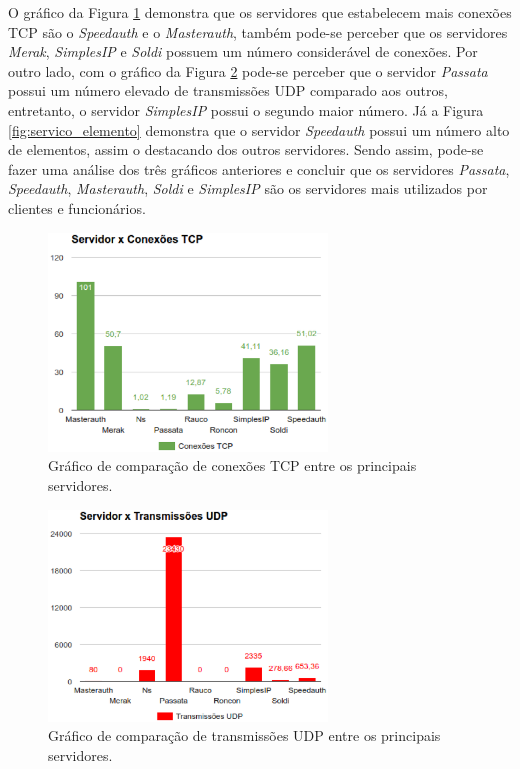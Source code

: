 O gráfico da Figura \ref{fig:servico_tcp} demonstra que os servidores que estabelecem mais conexões \ac{TCP} são o \textit{Speedauth} e o 
\textit{Masterauth}, também pode-se perceber que os servidores \textit{Merak}, \textit{SimplesIP} e \textit{Soldi} possuem um número considerável 
de conexões. Por outro lado, com o gráfico da Figura \ref{fig:servico_udp} pode-se perceber que o servidor \textit{Passata} possui um
número elevado de transmissões \ac{UDP} comparado aos outros, entretanto, o servidor \textit{SimplesIP} possui o segundo maior número. Já a Figura 
\ref{fig:servico_elemento} demonstra que o servidor \textit{Speedauth} possui um número alto de elementos, assim o destacando dos outros servidores.
Sendo assim, pode-se fazer uma análise dos três gráficos anteriores e concluir que os servidores \textit{Passata}, \textit{Speedauth}, 
\textit{Masterauth}, \textit{Soldi} e \textit{SimplesIP} são os servidores mais utilizados por clientes e funcionários.

\begin{figure}[h!]
 \centering
 \includegraphics[width=280px]{img/servico_tcp.eps}
 \caption{Gráfico de comparação de conexões TCP entre os principais servidores.}
 \label{fig:servico_tcp}
\end{figure}

\begin{figure}[h!]
 \centering
 \includegraphics[width=280px]{img/servico_udp.eps}
 \caption{Gráfico de comparação de transmissões UDP entre os principais servidores.}
 \label{fig:servico_udp}
\end{figure}

